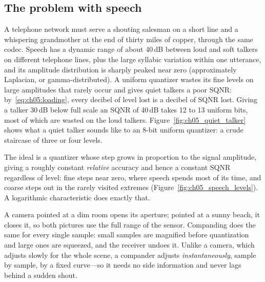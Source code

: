 \subsection{The problem with speech}

A telephone network must serve a shouting salesman on a short line and a whispering grandmother at
the end of thirty miles of copper, through the same codec. Speech has a dynamic range of about
40\,dB between loud and soft talkers on different telephone lines, plus the large syllabic variation
within one utterance, and its amplitude distribution is sharply peaked near zero (approximately
Laplacian, or gamma-distributed). A uniform quantizer wastes its fine levels on large amplitudes
that rarely occur and gives quiet talkers a poor SQNR: by~\eqref{eq:ch05:loading}, every decibel of
level lost is a decibel of SQNR lost. Giving a talker 30\,dB below full scale an SQNR of 40\,dB takes
12 to 13 uniform bits, most of which are wasted on the loud talkers.
Figure~\ref{fig:ch05_quiet_talker} shows what a quiet talker sounds like to an 8-bit uniform
quantizer: a crude staircase of three or four levels.


The ideal is a quantizer whose step grows in proportion to the signal amplitude, giving a
roughly constant \emph{relative} accuracy and hence a constant SQNR regardless of level: fine
steps near zero, where speech spends most of its time, and coarse steps out in the rarely visited
extremes (Figure~\ref{fig:ch05_speech_levels}). A logarithmic characteristic does exactly that.


\begin{analogy}
A camera pointed at a dim room opens its aperture; pointed at a sunny beach, it closes it, so
both pictures use the full range of the sensor. Companding does the same for every single sample:
small samples are magnified before quantization and large ones are squeezed, and the receiver
undoes it. Unlike a camera, which adjusts slowly for the whole scene, a compander adjusts
\emph{instantaneously}, sample by sample, by a fixed curve---so it needs no side information and
never lags behind a sudden shout.
\end{analogy}

